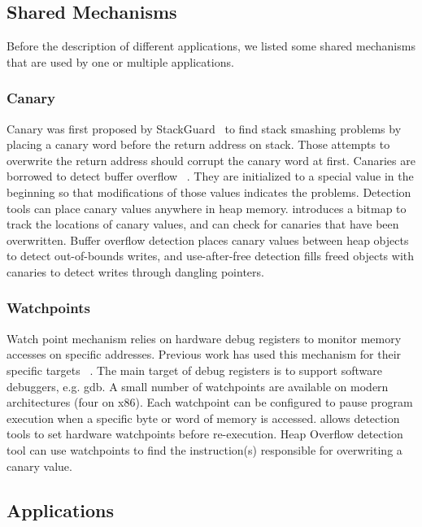 \label{sec:applications}

\subsection{Shared Mechanisms}
Before the description of different applications, we listed some shared mechanisms that are used by one or multiple applications. 

\subsubsection{Canary}
\label{sec:canary}
Canary was first proposed by StackGuard~\cite{StackGuard} to find stack smashing problems by placing a canary word before the return address on stack. Those attempts to overwrite the return address should corrupt the canary word at first. Canaries are borrowed to detect buffer overflow ~\cite{overflow:purify}. They are initialized to a special value in the beginning so that modifications of those values indicates the problems. Detection tools can place canary values anywhere in heap memory. \doubletake{} introduces a bitmap to track the locations of canary values, and can check for canaries that have been overwritten. Buffer overflow detection places canary values between heap objects to detect out-of-bounds writes, and use-after-free detection fills freed objects with canaries to detect writes through dangling pointers.

\subsubsection{Watchpoints}
\label{sec:watchpoints}
Watch point mechanism relies on hardware debug registers to monitor memory accesses on specific addresses. Previous work has used this mechanism for their specific targets ~\cite{fastboundschecking, Kivati}. The main target of debug registers is to support software debuggers, e.g. gdb. A small number of watchpoints are available on modern architectures (four on x86). Each watchpoint can be configured to pause program execution when a specific byte or word of memory is accessed. \doubletake{} allows detection tools to set hardware watchpoints before re-execution. Heap Overflow detection tool can use watchpoints to find the instruction(s) responsible for overwriting a canary value.

\subsection{Applications}
\label{sec:applications}

